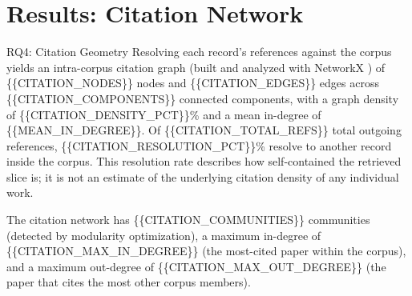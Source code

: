 \documentclass[
  ignorenonframetext,
]{beamer}
\author{}
\date{}
\begin{document}
\section{Results: Citation Network}\label{results-citation-network}

\begin{frame}[allowframebreaks]{RQ4: Citation Geometry}
\label{rq4-citation-geometry}
Resolving each record's references against the corpus yields an
intra-corpus citation graph (built and analyzed with NetworkX
) of \{\{CITATION\_NODES\}\} nodes and
\{\{CITATION\_EDGES\}\} edges across \{\{CITATION\_COMPONENTS\}\}
connected components, with a graph density of
\{\{CITATION\_DENSITY\_PCT\}\}\% and a mean in-degree of
\{\{MEAN\_IN\_DEGREE\}\}. Of \{\{CITATION\_TOTAL\_REFS\}\} total
outgoing references, \{\{CITATION\_RESOLUTION\_PCT\}\}\% resolve to
another record inside the corpus. This resolution rate describes how
self-contained the retrieved slice is; it is not an estimate of the
underlying citation density of any individual work.

The citation network has \{\{CITATION\_COMMUNITIES\}\} communities
(detected by modularity optimization), a maximum in-degree of
\{\{CITATION\_MAX\_IN\_DEGREE\}\} (the most-cited paper within the
corpus), and a maximum out-degree of \{\{CITATION\_MAX\_OUT\_DEGREE\}\}
(the paper that cites the most other corpus members).
\end{frame}
\end{document}
